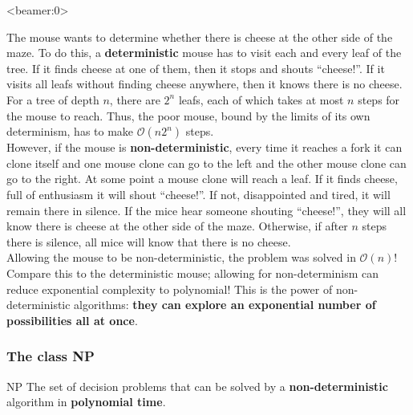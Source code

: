 \documentclass[handout, 12pt]{beamer}
\newcommand{\bigo}[1]{\mathcal{O}\mathopen{}\left(#1\right)\mathclose{}}
\begin{document}
\begin{frame}<beamer:0>

\footnotesize
The mouse wants to determine whether there is cheese at the other side of the maze. To do this, a \textbf{deterministic} mouse has to visit each and every leaf of the tree. If it finds cheese at one of them, then it stops and shouts ``cheese!''. If it visits all leafs without finding cheese anywhere, then it knows there is no cheese. For a tree of depth $n$, there are $2^n$ leafs, each of which takes at most $n$ steps for the mouse to reach. Thus, the poor mouse, bound by the limits of its own determinism, has to make $\bigo{n2^n}$ steps.
\\[0.6em]
However, if the mouse is \textbf{non-deterministic}, every time it reaches a fork it can clone itself and one mouse clone can go to the left and the other mouse clone can go to the right. At some point a mouse clone will reach a leaf. If it finds cheese, full of enthusiasm it will shout ``cheese!''. If not, disappointed and tired, it will remain there in silence. If the mice hear someone shouting ``cheese!'', they will all know there is cheese at the other side of the maze. Otherwise, if after $n$ steps there is silence, all mice will know that there is no cheese.
\\[0.6em]
Allowing the mouse to be non-deterministic, the problem was solved in $\bigo{n}$! Compare this to the deterministic mouse; allowing for non-determinism can reduce exponential complexity to polynomial! This is the power of non-deterministic algorithms: \textbf{they can explore an exponential number of possibilities all at once}.

\end{frame}

\begin{frame}

\frametitle{The class NP}

\begin{block}{NP}
The set of decision problems that can be solved by a \textbf{non-deterministic} algorithm in \textbf{polynomial time}.
\end{block}

\end{frame}
\end{document}
